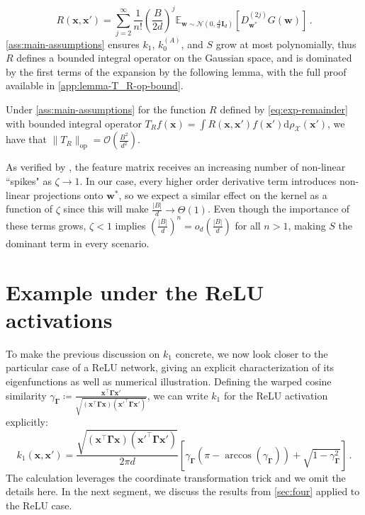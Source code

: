 \begin{equation}\label{eq:exp-remainder}
    R(\bm x, \bm x') = \sum_{j=2}^{\infty} \frac{1}{n!} \left(\frac{B}{2d}\right)^j \mathbb{E}_{\bm w \sim \mathcal{N}(0, \frac{A}{d}\bm I_d)}[D_{\bm w^*}^{(2j)}G(\bm w)]\, .
\end{equation}
\cref{ass:main-assumptions} ensures $k_1$, $k_0^{(A)}$, and $S$ grow at most polynomially, thus $R$ defines a bounded integral operator on the Gaussian space, and is dominated by the first terms of the expansion by the following lemma, with the full proof available in \cref{app:lemma-T_R-op-bound}.
\begin{lemma}\label{lemma:T_R-op-bound}
    Under \cref{ass:main-assumptions} for the function $R$ defined by \cref{eq:exp-remainder} with bounded integral operator $T_R f(\bm x) = \int R(\bm x, \bm x') f(\bm x') \mathrm d \rho_{\mathcal X}(\bm x')$, we have that $\|T_R\|_{\text{op}} = \mathcal O\left(\frac{B^2}{d^2}\right)$.
\end{lemma}
\begin{remark}
    As verified by \cite{moniri2023theory}, the feature matrix receives an increasing number of non-linear ``spikes" as $\zeta \to 1$. In our case, every higher order derivative term introduces non-linear projections onto $\bm w^*$, so we expect a similar effect on the kernel as a function of $\zeta$ since this will make $\frac{|B|}{d} \to \Theta(1)$. Even though the importance of these terms grows, $\zeta < 1$ implies $\left(\frac{|B|}{d}\right)^n = o_d\left(\frac{|B|}{d}\right)$ for all $n > 1$, making $S$ the dominant term in every scenario.
\end{remark}

\section{Example under the ReLU activations}
\label{sec:relu}

To make the previous discussion on $k_1$ concrete, we now look closer to the particular case of a ReLU network, giving an explicit characterization of its eigenfunctions as well as numerical illustration. Defining the warped cosine similarity $\gamma_{\bm \Gamma} \coloneqq \frac{\bm x^\top \bm \Gamma \bm x'}{\sqrt{(\bm x^\top \bm \Gamma \bm x)(\bm x'^\top \bm \Gamma \bm x')}}$, we can write $k_{1}$ for the ReLU activation explicitly:
\begin{equation}\label{eq:relu-k1}
    k_1(\bm x, \bm x') = \frac{\sqrt{(\bm x^\top \bm \Gamma \bm x)(\bm x'^\top \bm \Gamma \bm x')}}{2\pi d}\left[\gamma_{\bm \Gamma}(\pi -\arccos (\gamma_{\bm \Gamma})) +\sqrt{1 - \gamma_{\bm \Gamma}^2}\right]\,.
\end{equation}
The calculation leverages the coordinate transformation trick \citep[Appendix A]{liao2018spectrum} and we omit the details here. In the next segment, we discuss the results from \cref{sec:four} applied to the ReLU case.

